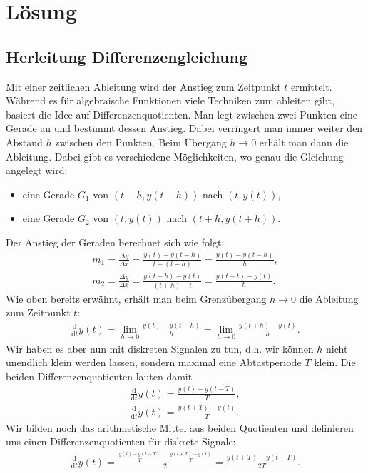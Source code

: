 \documentclass[11pt,a4paper,DIV=12]{scrartcl}
\begin{document}
\section{Lösung}
	
\subsection{Herleitung Differenzengleichung}
Mit einer zeitlichen Ableitung wird der Anstieg zum Zeitpunkt $t$ ermittelt. Während es für algebraische Funktionen viele Techniken zum ableiten gibt, basiert die Idee auf Differenzenquotienten. Man legt zwischen zwei Punkten eine Gerade an und bestimmt dessen Anstieg. Dabei verringert man immer weiter den Abstand $h$ zwischen den Punkten. Beim Übergang $h\rightarrow0$ erhält man dann die Ableitung. Dabei gibt es verschiedene Möglichkeiten, wo genau die Gleichung angelegt wird:\\
\begin{itemize}
	\item eine Gerade $G_1$ von $(t-h,y(t-h))$ nach $(t,y(t))$,
	\item eine Gerade $G_2$ von $(t,y(t))$ nach $(t+h,y(t+h))$.
\end{itemize}
Der Anstieg der Geraden berechnet sich wie folgt:
\begin{gather}
	m_1=\frac{\Delta y}{\Delta x}=\frac{y(t)-y(t-h)}{t-(t-h)}=\frac{y(t)-y(t-h)}{h},\\
	m_2=\frac{\Delta y}{\Delta x}=\frac{y(t+h)-y(t)}{(t+h)-t}=\frac{y(t+t)-y(t)}{h}.
\end{gather}
Wie oben bereits erwähnt, erhält man beim Grenzübergang $h\rightarrow0$ die Ableitung zum Zeitpunkt $t$:
\begin{align}
	\frac{\mathrm{d}}{\mathrm{d}t}y(t)=\lim\limits_{h\rightarrow0}\frac{y(t)-y(t-h)}{h}=\lim\limits_{h\rightarrow0}\frac{y(t+h)-y(t)}{h}.
\end{align}
Wir haben es aber nun mit diskreten Signalen zu tun, d.h. wir können $h$ nicht unendlich klein werden lassen, sondern maximal eine Abtastperiode $T$ klein. Die beiden Differenzenquotienten lauten damit
\begin{gather}
	\frac{\mathrm{d}}{\mathrm{d}t}y(t)=\frac{y(t)-y(t-T)}{T},\\
	\frac{\mathrm{d}}{\mathrm{d}t}y(t)=\frac{y(t+T)-y(t)}{T}.
\end{gather}
Wir bilden noch das arithmetische Mittel aus beiden Quotienten und definieren uns einen Differenzenquotienten für diskrete Signale:
\begin{gather}
	\frac{\mathrm{d}}{\mathrm{d}t}y(t)=\frac{\frac{y(t)-y(t-T)}{T}+\frac{y(t+T)-y(t)}{T}}{2}=\frac{y(t+T)-y(t-T)}{2T}.
\end{gather}
\end{document}
